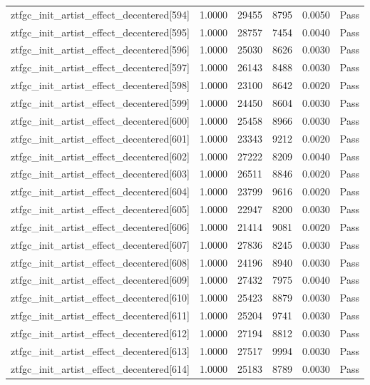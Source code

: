 \begin{table}[htbp]
\begin{tabular}{llrrll}
ztfgc\_init\_artist\_effect\_decentered[594] & 1.0000 & 29455 & 8795 & 0.0050 & Pass \\
ztfgc\_init\_artist\_effect\_decentered[595] & 1.0000 & 28757 & 7454 & 0.0040 & Pass \\
ztfgc\_init\_artist\_effect\_decentered[596] & 1.0000 & 25030 & 8626 & 0.0030 & Pass \\
ztfgc\_init\_artist\_effect\_decentered[597] & 1.0000 & 26143 & 8488 & 0.0030 & Pass \\
ztfgc\_init\_artist\_effect\_decentered[598] & 1.0000 & 23100 & 8642 & 0.0020 & Pass \\
ztfgc\_init\_artist\_effect\_decentered[599] & 1.0000 & 24450 & 8604 & 0.0030 & Pass \\
ztfgc\_init\_artist\_effect\_decentered[600] & 1.0000 & 25458 & 8966 & 0.0030 & Pass \\
ztfgc\_init\_artist\_effect\_decentered[601] & 1.0000 & 23343 & 9212 & 0.0020 & Pass \\
ztfgc\_init\_artist\_effect\_decentered[602] & 1.0000 & 27222 & 8209 & 0.0040 & Pass \\
ztfgc\_init\_artist\_effect\_decentered[603] & 1.0000 & 26511 & 8846 & 0.0020 & Pass \\
ztfgc\_init\_artist\_effect\_decentered[604] & 1.0000 & 23799 & 9616 & 0.0020 & Pass \\
ztfgc\_init\_artist\_effect\_decentered[605] & 1.0000 & 22947 & 8200 & 0.0030 & Pass \\
ztfgc\_init\_artist\_effect\_decentered[606] & 1.0000 & 21414 & 9081 & 0.0020 & Pass \\
ztfgc\_init\_artist\_effect\_decentered[607] & 1.0000 & 27836 & 8245 & 0.0030 & Pass \\
ztfgc\_init\_artist\_effect\_decentered[608] & 1.0000 & 24196 & 8940 & 0.0030 & Pass \\
ztfgc\_init\_artist\_effect\_decentered[609] & 1.0000 & 27432 & 7975 & 0.0040 & Pass \\
ztfgc\_init\_artist\_effect\_decentered[610] & 1.0000 & 25423 & 8879 & 0.0030 & Pass \\
ztfgc\_init\_artist\_effect\_decentered[611] & 1.0000 & 25204 & 9741 & 0.0030 & Pass \\
ztfgc\_init\_artist\_effect\_decentered[612] & 1.0000 & 27194 & 8812 & 0.0030 & Pass \\
ztfgc\_init\_artist\_effect\_decentered[613] & 1.0000 & 27517 & 9994 & 0.0030 & Pass \\
ztfgc\_init\_artist\_effect\_decentered[614] & 1.0000 & 25183 & 8789 & 0.0030 & Pass \\

\end{tabular}
\end{table}
